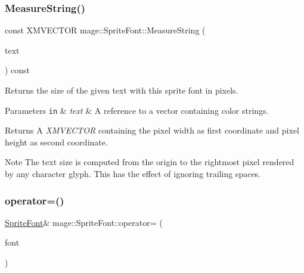 \subsubsection{\texorpdfstring{Measure\+String()}{MeasureString()}\hspace{0.1cm}{\footnotesize\ttfamily [2/2]}}
{\footnotesize\ttfamily const X\+M\+V\+E\+C\+T\+OR mage\+::\+Sprite\+Font\+::\+Measure\+String (\begin{DoxyParamCaption}\item[{const vector$<$ \hyperlink{structmage_1_1_color_string}{Color\+String} $>$ \&}]{text }\end{DoxyParamCaption}) const}

Returns the size of the given text with this sprite font in pixels.


\begin{DoxyParams}[1]{Parameters}
\mbox{\tt in}  & {\em text} & A reference to a vector containing color strings. \\
\hline
\end{DoxyParams}
\begin{DoxyReturn}{Returns}
A {\itshape X\+M\+V\+E\+C\+T\+OR} containing the pixel width as first coordinate and pixel height as second coordinate. 
\end{DoxyReturn}
\begin{DoxyNote}{Note}
The text size is computed from the origin to the rightmost pixel rendered by any character glyph. This has the effect of ignoring \textquotesingle{}trailing spaces\textquotesingle{}. 
\end{DoxyNote}
\hypertarget{classmage_1_1_sprite_font_a3f95359a336adc87088eefe3103a770b}{}\label{classmage_1_1_sprite_font_a3f95359a336adc87088eefe3103a770b} 
\subsubsection{\texorpdfstring{operator=()}{operator=()}\hspace{0.1cm}{\footnotesize\ttfamily [1/2]}}
{\footnotesize\ttfamily \hyperlink{classmage_1_1_sprite_font}{Sprite\+Font}\& mage\+::\+Sprite\+Font\+::operator= (\begin{DoxyParamCaption}\item[{const \hyperlink{classmage_1_1_sprite_font}{Sprite\+Font} \&}]{font }\end{DoxyParamCaption})\hspace{0.3cm}{\ttfamily [delete]}}

